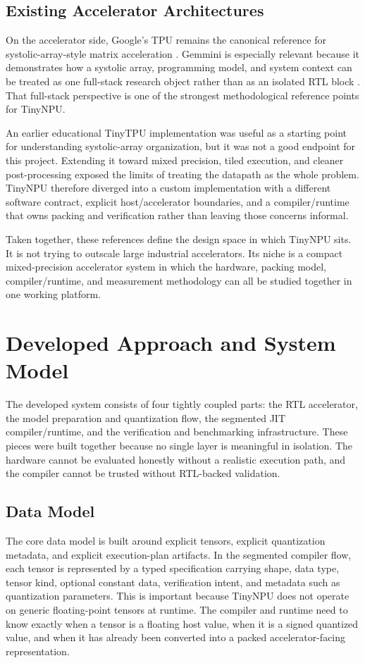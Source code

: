 \documentclass[a4paper, 12pt, titlepage]{article}
\begin{document}
\subsection{Existing Accelerator Architectures}
On the accelerator side, Google's TPU remains the canonical reference for systolic-array-style matrix acceleration \cite{jouppi2017datacenter}. Gemmini is especially relevant because it demonstrates how a systolic array, programming model, and system context can be treated as one full-stack research object rather than as an isolated RTL block \cite{genc2021gemmini}. That full-stack perspective is one of the strongest methodological reference points for TinyNPU.

An earlier educational TinyTPU implementation was useful as a starting point for understanding systolic-array organization, but it was not a good endpoint for this project. Extending it toward mixed precision, tiled execution, and cleaner post-processing exposed the limits of treating the datapath as the whole problem. TinyNPU therefore diverged into a custom implementation with a different software contract, explicit host/accelerator boundaries, and a compiler/runtime that owns packing and verification rather than leaving those concerns informal.

Taken together, these references define the design space in which TinyNPU sits. It is not trying to outscale large industrial accelerators. Its niche is a compact mixed-precision accelerator system in which the hardware, packing model, compiler/runtime, and measurement methodology can all be studied together in one working platform.
\newpage

\section{Developed Approach and System Model}
The developed system consists of four tightly coupled parts: the RTL accelerator, the model preparation and quantization flow, the segmented JIT compiler/runtime, and the verification and benchmarking infrastructure. These pieces were built together because no single layer is meaningful in isolation. The hardware cannot be evaluated honestly without a realistic execution path, and the compiler cannot be trusted without RTL-backed validation.
\subsection{Data Model}
The core data model is built around explicit tensors, explicit quantization metadata, and explicit execution-plan artifacts. In the segmented compiler flow, each tensor is represented by a typed specification carrying shape, data type, tensor kind, optional constant data, verification intent, and metadata such as quantization parameters. This is important because TinyNPU does not operate on generic floating-point tensors at runtime. The compiler and runtime need to know exactly when a tensor is a floating host value, when it is a signed quantized value, and when it has already been converted into a packed accelerator-facing representation.
\end{document}
